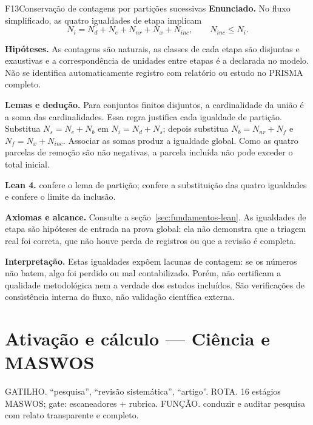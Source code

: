 \begin{formalizacao}{F13}{Conservação de contagens por partições sucessivas}
\textbf{Enunciado.} No fluxo simplificado, as quatro igualdades de etapa implicam
\[
N_i=N_d+N_e+N_{nr}+N_x+N_{inc},\qquad N_{inc}\leq N_i.
\]

\textbf{Hipóteses.} As contagens são naturais, as classes de cada etapa são disjuntas e exaustivas e a correspondência de unidades entre etapas é a declarada no modelo. Não se identifica automaticamente registro com relatório ou estudo no PRISMA completo.

\textbf{Lemas e dedução.} Para conjuntos finitos disjuntos, a cardinalidade da união é a soma das cardinalidades. Essa regra justifica cada igualdade de partição. Substitua $N_s=N_e+N_b$ em $N_i=N_d+N_s$; depois substitua $N_b=N_{nr}+N_f$ e $N_f=N_x+N_{inc}$. Associar as somas produz a igualdade global. Como as quatro parcelas de remoção são não negativas, a parcela incluída não pode exceder o total inicial.

\textbf{Lean 4.}  confere o lema de partição;  confere a substituição das quatro igualdades e  confere o limite da inclusão.

\textbf{Axiomas e alcance.} Consulte a seção~\ref{sec:fundamentos-lean}. As igualdades de etapa são hipóteses de entrada na prova global: ela não demonstra que a triagem real foi correta, que não houve perda de registros ou que a revisão é completa.
\end{formalizacao}

\begin{descricao}
\textbf{Interpretação.} Estas igualdades expõem lacunas de contagem: se os números não batem, algo foi perdido ou mal contabilizado. Porém, não certificam a qualidade metodológica nem a verdade dos estudos incluídos. São verificações de consistência interna do fluxo, não validação científica externa.
\end{descricao}

\section[Ativação e cálculo]{Ativação e cálculo — Ciência e MASWOS}

\begin{processo}
GATILHO. ``pesquisa'', ``revisão sistemática'', ``artigo''.
ROTA. 16 estágios MASWOS; gate: escaneadores + rubrica.
FUNÇÃO. conduzir e auditar pesquisa com relato transparente e completo.
\end{processo}


